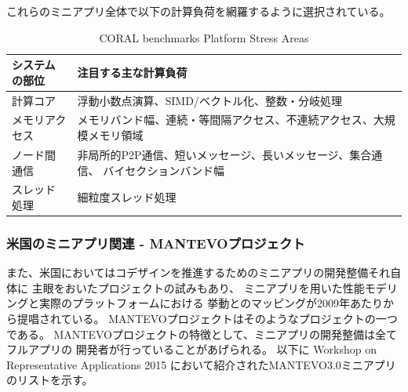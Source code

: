 これらのミニアプリ全体で以下の計算負荷を網羅するように選択されている。

\begin{table}[H]
\caption{CORAL benchmarks Platform Stress Areas}
\label{tab:CORAL-benchmarks-stress}
{
\begin{tabular}{p{30mm}|p{120mm}} \hline
システムの部位	&	注目する主な計算負荷 \\ \hline \hline

計算コア
	& 浮動小数点演算、SIMD/ベクトル化、整数・分岐処理 \\
	\hline
メモリアクセス
	& メモリバンド幅、連続・等間隔アクセス、不連続アクセス、大規模メモリ領域\\
	\hline
ノード間通信
	& 非局所的P2P通信、短いメッセージ、長いメッセージ、集合通信、
		バイセクションバンド幅　\\
	\hline
スレッド処理
	& 細粒度スレッド処理　\\
	\hline
\end{tabular}
}
\end{table}


\subsubsection{米国のミニアプリ関連 - MANTEVOプロジェクト}
また、米国においてはコデザインを推進するためのミニアプリの開発整備それ自体に
主眼をおいたプロジェクトの試みもあり、
ミニアプリを用いた性能モデリングと実際のプラットフォームにおける
挙動とのマッピングが2009年あたりから提唱されている。
MANTEVOプロジェクトはそのようなプロジェクトの一つである\cite{MANTEVO-project}。
MANTEVOプロジェクトの特徴として、ミニアプリの開発整備は全てフルアプリの
開発者が行っていることがあげられる。
以下に Workshop on Representative Applications 2015 \cite{MANTEVO-Reps}
において紹介されたMANTEVO3.0ミニアプリのリストを示す。


